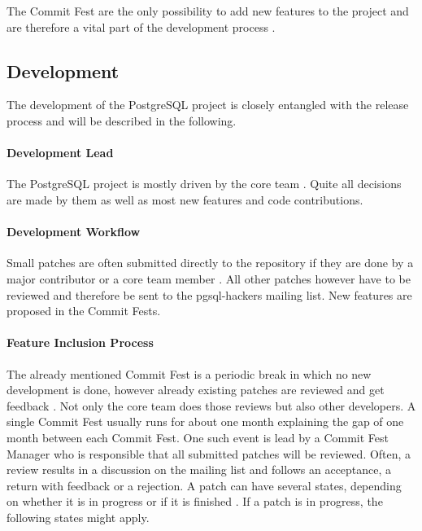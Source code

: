 The Commit Fest are the only possibility to add new features to the project and
are therefore a vital part of the development process
\cite{PostgreSQLDevelopment,PostgreSQLCommitFest}. 

\subsection{Development}

The development of the PostgreSQL project is closely entangled with the release
process and will be described in the following.

\paragraph{Development Lead}

The PostgreSQL project is mostly driven by the core team
\cite{PostgreSQLDevFAQ,PostgreSQLFAQ,PostgreSQLContributors}. Quite all
decisions are made by them as well as most new features and code contributions.

\paragraph{Development Workflow}

Small patches are often submitted directly to the repository if they are done
by a major contributor or a core team member \cite{PostgreSQLDevFAQ}. All other
patches however have to be reviewed and therefore be sent to the pgsql-hackers
mailing list. New features are proposed in the Commit Fests.

\paragraph{Feature Inclusion Process}

The already mentioned Commit Fest is a periodic break in which no new
development is done, however already existing patches are reviewed and get
feedback \cite{PostgreSQLCommitFest}. Not only the core team does those reviews
but also other developers. A single Commit Fest usually runs for about one
month explaining the gap of one month between each Commit Fest. One such event
is lead by a Commit Fest Manager who is responsible that all submitted patches
will be reviewed. Often, a review results in a discussion on the mailing list
and follows an acceptance, a return with feedback or a rejection. A patch can
have several states, depending on whether it is in progress or if it is
finished \cite{PostgreSQLCommitFestRunning}. If a patch is in progress, the
following states might apply.

